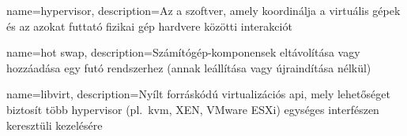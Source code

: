 
{
	name=hypervisor,
	description={Az a szoftver, amely koordinálja a virtuális gépek és az azokat futtató fizikai gép hardvere közötti interakciót}
}

{
	name={hot swap},
	description={Számítógép-komponensek eltávolítása vagy hozzáadása egy futó rendszerhez (annak leállítása vagy újraindítása nélkül)}
}

{
	name=libvirt,
	description={Nyílt forráskódú virtualizációs \acrshort{api}, mely lehetőséget biztosít több \gls{hypervisor} (pl.~\acrshort{kvm}, XEN, VMware ESXi) egységes interfészen keresztüli kezelésére}
}